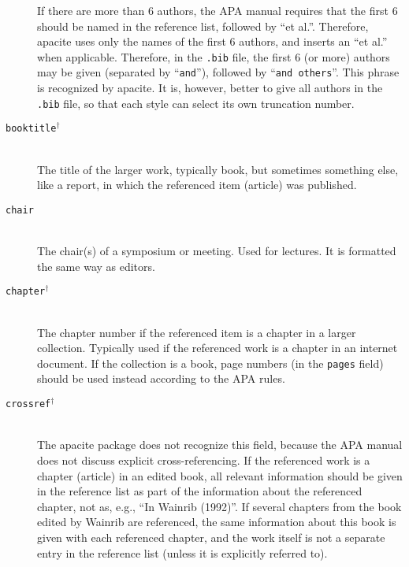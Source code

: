 \documentclass{article}
\newcommand{\LC}{\mbox{${}^{\dag}$}}%
\newcommand{\pkg}[1]{\textsf{#1}}%
\newcommand{\fname}[1]{\texttt{#1}}%
\newcommand{\fieldname}[1]{\texttt{#1}}%
\begin{document}
\begin{description}
       If there are more than 6 authors, the APA manual requires
       that the first 6 should be named in the reference list,
       followed by ``et al.''. Therefore, \pkg{apacite} uses
       only the names of the first 6 authors, and inserts an
       ``et al.'' when applicable. Therefore, in the \fname{.bib}
       file, the first 6 (or more) authors may be given (separated by
       ``\verb+and+''), followed by ``\verb+and others+''. This phrase
       is recognized by \pkg{apacite}.
       It is, however, better to give all authors in
       the \fname{.bib} file, so that each style can select its
       own truncation number.

    \item[\fieldname{booktitle}\LC] \mbox{}\\
       The title of the larger work, typically book, but sometimes
       something else, like a report, in which the referenced item
       (article) was published.

    \item[\fieldname{chair}] \mbox{}\\
       The chair(s) of a symposium or meeting. Used for lectures.
       It is formatted the same way as editors.

    \item[\fieldname{chapter}\LC] \mbox{}\\
       The chapter number if the referenced item is a chapter in
       a larger collection. Typically used if the referenced work
       is a chapter in an internet document. If the collection is
       a book, page numbers (in the \fieldname{pages} field)
       should be used instead according to the APA rules.

    \item[\fieldname{crossref}\LC] \mbox{}\\
       The \pkg{apacite} package does not recognize this field,
       because the APA manual does not discuss explicit
       cross-referencing. If the referenced work is a chapter
       (article) in an edited book, all relevant information
       should be given in the reference list as part of the
       information about the referenced chapter, not as, e.g.,
       ``In Wainrib (1992)''. If several chapters from the
       book edited by Wainrib are referenced, the same information
       about this book is given with each referenced chapter,
       and the work itself is not a separate entry in the reference
       list (unless it is explicitly referred to).


\end{description}
\end{document}
